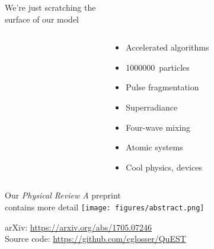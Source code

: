 \documentclass[12pt,usenames,dvipsnames]{beamer}
\begin{document}
\begin{frame}{We're just scratching the \\ surface of our model}
  \begin{columns}
    \begin{column}{0.6\textwidth}
    \end{column}
    \begin{column}{0.4\textwidth}
      \begin{itemize}
        \vspace{-1cm}
        \setlength{\itemindent}{-.3in}
        \item Accelerated algorithms
        \item \SI{1000000} particles
        \item Pulse fragmentation
        \item Superradiance
        \item Four-wave mixing
        \item Atomic systems
        \item Cool physics, devices
      \end{itemize}
    \end{column}
  \end{columns}
\end{frame}


\begin{frame}{Our \emph{Physical Review A} preprint \\ contains more detail}
  \texttt{[image: figures/abstract.png]} 

  \vspace{0.6cm}

  \hfill arXiv: \url{https://arxiv.org/abs/1705.07246} \\
  \hfill Source code: \url{https://github.com/cglosser/QuEST}
\end{frame}
\end{document}
